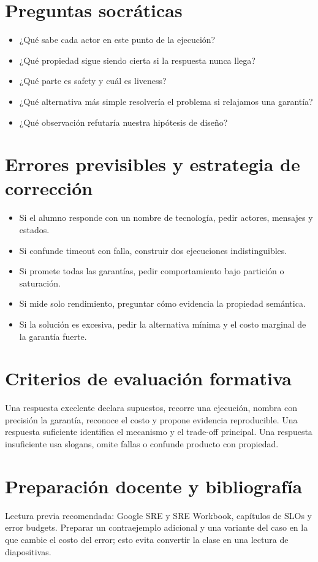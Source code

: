 \documentclass[variant=docente,cover=institutional,mode=screen]{ua-engineering-v6-article}
\begin{document}
\section{Preguntas socráticas}
\begin{itemize}
\item ¿Qué sabe cada actor en este punto de la ejecución?
\item ¿Qué propiedad sigue siendo cierta si la respuesta nunca llega?
\item ¿Qué parte es safety y cuál es liveness?
\item ¿Qué alternativa más simple resolvería el problema si relajamos una garantía?
\item ¿Qué observación refutaría nuestra hipótesis de diseño?
\end{itemize}

\section{Errores previsibles y estrategia de corrección}
\begin{itemize}
\item Si el alumno responde con un nombre de tecnología, pedir actores, mensajes y estados.
\item Si confunde timeout con falla, construir dos ejecuciones indistinguibles.
\item Si promete todas las garantías, pedir comportamiento bajo partición o saturación.
\item Si mide solo rendimiento, preguntar cómo evidencia la propiedad semántica.
\item Si la solución es excesiva, pedir la alternativa mínima y el costo marginal de la garantía fuerte.
\end{itemize}

\section{Criterios de evaluación formativa}
Una respuesta excelente declara supuestos, recorre una ejecución, nombra con precisión la garantía, reconoce el costo y propone evidencia reproducible. Una respuesta suficiente identifica el mecanismo y el trade-off principal. Una respuesta insuficiente usa slogans, omite fallas o confunde producto con propiedad.

\section{Preparación docente y bibliografía}
Lectura previa recomendada: Google SRE y SRE Workbook, capítulos de SLOs y error budgets. Preparar un contraejemplo adicional y una variante del caso en la que cambie el costo del error; esto evita convertir la clase en una lectura de diapositivas.
\end{document}

